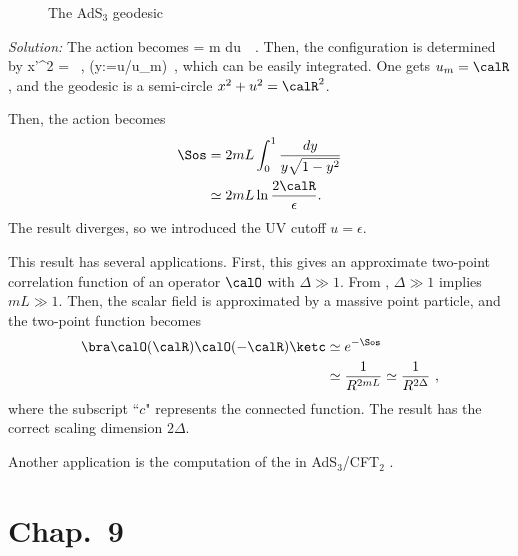 \begin{figure}[tb]
\centering
\vskip2mm
\caption{The AdS$_3$ geodesic}
\label{fig:geodesic}
\end{figure}%

{\color{blue} 
\textit{Solution:}
The action becomes 
\be
%
\action = m \int du\,  ~.
%
\ee
Then, the configuration is determined by
\be
%
x'^2 = ~, \qquad(y:=u/u_m)~,
%
\ee
which can be easily integrated. One gets $u_m=\calR$, and the geodesic is a semi-circle $x^2+u^2=\calR^2$. 

Then, the action becomes
\begin{align}
%
\Sos &= 2mL \int_0^1 \frac{dy}{y\sqrt{1-y^2}} \\
&\simeq 2mL \ln \frac{2\calR}{\epsilon}.
%
\end{align}
The result diverges, so we introduced the UV cutoff $u=\epsilon$.

This result has several applications. First, this gives an approximate two-point correlation function of an operator $\calO$ with $\Delta \gg 1$. From , $\Delta \gg 1$ implies $mL \gg 1$. Then, the scalar field is approximated by a massive point particle, and the two-point function becomes
\begin{align}
%
\bra \calO(\calR)\calO(-\calR) \ketc &\simeq e^{-\Sos} \\
&\simeq \frac{1}{R^{2mL}} \simeq \frac{1}{R^{2\Delta}}~,
%
\end{align}
where the subscript ``$c$" represents the connected function. The result has the correct scaling dimension $2\Delta$.

Another application is the computation of the  in AdS$_3$/CFT$_2$ \cite{Nishioka:2009un}.
}



\section*{Chap.~9}%

